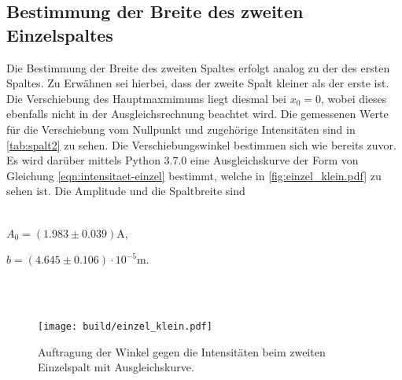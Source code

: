 %
%
\subsection{Bestimmung der Breite des zweiten Einzelspaltes}
    Die Bestimmung der Breite des zweiten Spaltes erfolgt analog zu der des ersten Spaltes. Zu Erwähnen sei hierbei, dass der zweite Spalt kleiner 
    als der erste ist. Die Verschiebung des Hauptmaxmimums liegt diesmal bei $x_0 = 0$, wobei dieses ebenfalls nicht in der Ausgleichsrechnung
    beachtet wird. Die gemessenen Werte für die Verschiebung vom Nullpunkt und zugehörige Intensitäten sind 
    in \autoref{tab:spalt2} zu sehen. Die Verschiebungswinkel bestimmen sich wie bereits zuvor.
    Es wird darüber mittels Python 3.7.0 eine Ausgleichskurve der Form von Gleichung 
    \eqref{eqn:intensitaet-einzel} bestimmt, welche in \autoref{fig:einzel_klein.pdf} zu sehen ist. Die Amplitude und die Spaltbreite sind 
    \\ \\ 
    \centerline{$A_0 = (1.983 \pm 0.039) $A,}
    \centerline{$b = (4.645\pm 0.106) \cdot 10^{-5}$m.}
    \\ \\
    
    \begin{figure}
        \centering
        \texttt{[image: build/einzel\_klein.pdf]}
        \caption{Auftragung der Winkel gegen die Intensitäten beim zweiten Einzelspalt mit Ausgleichskurve.}
        \label{fig:einzel_klein}
    \end{figure}


